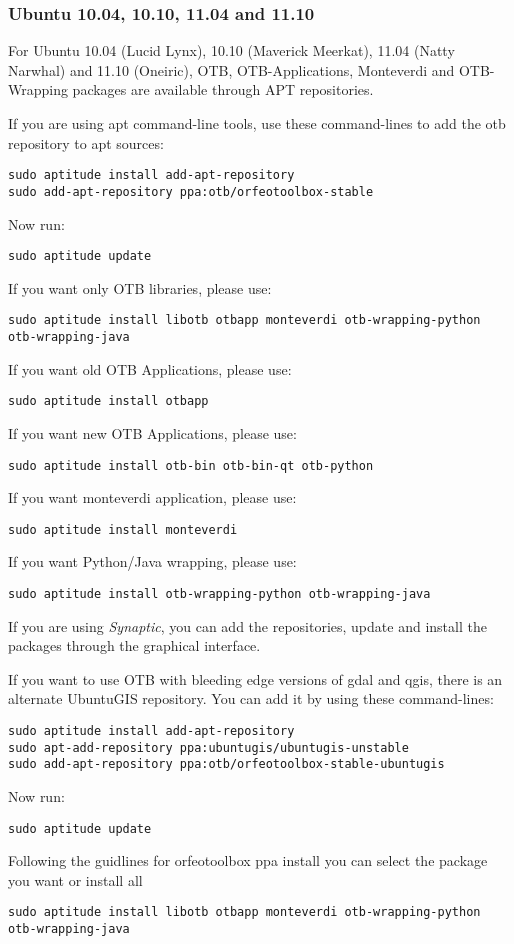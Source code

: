\subsubsection{Ubuntu 10.04, 10.10, 11.04 and 11.10}
\label{ssec:ubuntu_binaries}
For Ubuntu 10.04 (Lucid Lynx), 10.10 (Maverick Meerkat), 11.04 (Natty Narwhal) and 11.10 (Oneiric), OTB, 
OTB-Applications, Monteverdi and OTB-Wrapping packages are available through APT repositories.

If you are using apt command-line tools, use these command-lines to add the otb repository to apt sources:
\begin{verbatim}
sudo aptitude install add-apt-repository 
sudo add-apt-repository ppa:otb/orfeotoolbox-stable
\end{verbatim}
Now run:
\begin{verbatim}
sudo aptitude update
\end{verbatim}
If you want only OTB libraries, please use:
\begin{verbatim}
sudo aptitude install libotb otbapp monteverdi otb-wrapping-python otb-wrapping-java
\end{verbatim}

If you want old OTB Applications, please use:
\begin{verbatim}
sudo aptitude install otbapp
\end{verbatim}

If you want new OTB Applications, please use:
\begin{verbatim}
sudo aptitude install otb-bin otb-bin-qt otb-python
\end{verbatim}

If you want monteverdi application, please use:
\begin{verbatim}
sudo aptitude install monteverdi
\end{verbatim}

If you want Python/Java wrapping, please use:
\begin{verbatim}
sudo aptitude install otb-wrapping-python otb-wrapping-java
\end{verbatim}

If you are using \emph{Synaptic}, you can add the repositories, update and install the packages through the
graphical interface.

If you want to use OTB with bleeding edge versions of gdal and qgis, there is an alternate UbuntuGIS repository.
You can add it by using these command-lines:
\begin{verbatim}
sudo aptitude install add-apt-repository 
sudo apt-add-repository ppa:ubuntugis/ubuntugis-unstable
sudo add-apt-repository ppa:otb/orfeotoolbox-stable-ubuntugis
\end{verbatim}
Now run:
\begin{verbatim}
sudo aptitude update
\end{verbatim}
Following the guidlines for orfeotoolbox ppa install you can select the package you want or install all
\begin{verbatim}
sudo aptitude install libotb otbapp monteverdi otb-wrapping-python otb-wrapping-java
\end{verbatim}

